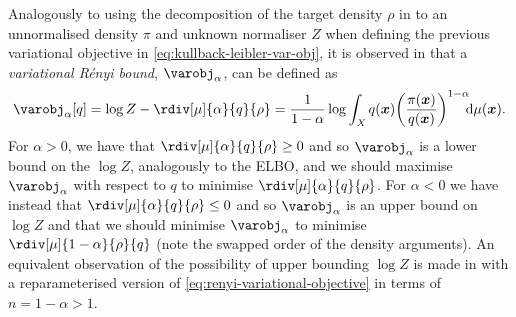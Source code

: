 Analogously to using the decomposition of the target density $\rho$ in to an unnormalised density $\pi$ and unknown normaliser $Z$ when defining the previous variational objective in \eqref{eq:kullback-leibler-var-obj}, it is observed in \citep{li2016renyi} that a \emph{variational R\'{e}nyi bound}, $\varobj_{\alpha}$, can be defined as
\begin{equation}\label{eq:renyi-variational-objective}
\begin{split}
  \varobj_{\alpha}\lsb q \rsb
  = 
  \log Z - \rdiv[\mu]{\alpha}{q}{\rho}
  =
  \frac{1}{1-\alpha} 
  \log \int_{\set{X}} q(\vct{x}) \lpa \frac{\pi(\vct{x})}{q(\vct{x})}\rpa^{1-\alpha} \kern-3pt\dr\mu(\vct{x}).
\end{split}
\end{equation}
For $\alpha > 0$, we have that $\rdiv[\mu]{\alpha}{q}{\rho} \geq 0$ and so $\varobj_\alpha$ is a lower bound on the $\log Z$, analogously to the \ac{ELBO}, and we should maximise $\varobj_\alpha$ with respect to $q$ to minimise $\rdiv[\mu]{\alpha}{q}{\rho}$. For $\alpha < 0$ we have instead that $\rdiv[\mu]{\alpha}{q}{\rho} \leq 0$ and so $\varobj_{\alpha}$ is an upper bound on $\log Z$ and that we should minimise $\varobj_\alpha$ to minimise $\rdiv[\mu]{1-\alpha}{\rho}{q}$ (note the swapped order of the density arguments). An equivalent observation of the possibility of upper bounding $\log Z$ is made in \citep{dieng2016chi} with a reparameterised version of \eqref{eq:renyi-variational-objective} in terms of $n=1-\alpha > 1$.

